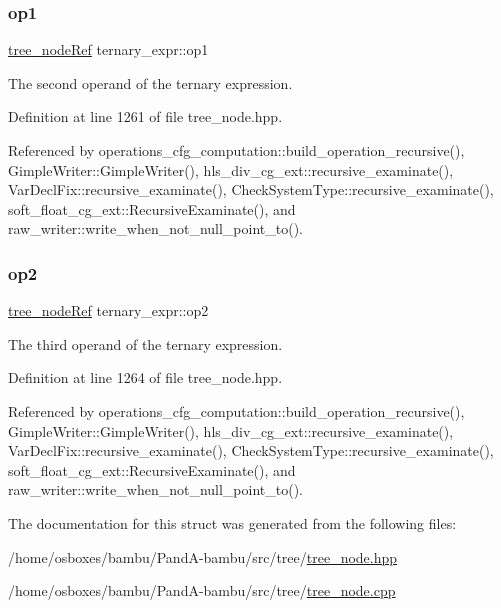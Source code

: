 \mbox{\label{structternary__expr_ad67e5b5fdfe02673e426a8f9cc743ed3}} 
\subsubsection{\texorpdfstring{op1}{op1}}
{\footnotesize\ttfamily \hyperlink{tree__node_8hpp_a6ee377554d1c4871ad66a337eaa67fd5}{tree\+\_\+node\+Ref} ternary\+\_\+expr\+::op1}



The second operand of the ternary expression. 



Definition at line 1261 of file tree\+\_\+node.\+hpp.



Referenced by operations\+\_\+cfg\+\_\+computation\+::build\+\_\+operation\+\_\+recursive(), Gimple\+Writer\+::\+Gimple\+Writer(), hls\+\_\+div\+\_\+cg\+\_\+ext\+::recursive\+\_\+examinate(), Var\+Decl\+Fix\+::recursive\+\_\+examinate(), Check\+System\+Type\+::recursive\+\_\+examinate(), soft\+\_\+float\+\_\+cg\+\_\+ext\+::\+Recursive\+Examinate(), and raw\+\_\+writer\+::write\+\_\+when\+\_\+not\+\_\+null\+\_\+point\+\_\+to().

\mbox{\label{structternary__expr_a55f515fdd2b6a3c150dfcfb4506a43ca}} 
\subsubsection{\texorpdfstring{op2}{op2}}
{\footnotesize\ttfamily \hyperlink{tree__node_8hpp_a6ee377554d1c4871ad66a337eaa67fd5}{tree\+\_\+node\+Ref} ternary\+\_\+expr\+::op2}



The third operand of the ternary expression. 



Definition at line 1264 of file tree\+\_\+node.\+hpp.



Referenced by operations\+\_\+cfg\+\_\+computation\+::build\+\_\+operation\+\_\+recursive(), Gimple\+Writer\+::\+Gimple\+Writer(), hls\+\_\+div\+\_\+cg\+\_\+ext\+::recursive\+\_\+examinate(), Var\+Decl\+Fix\+::recursive\+\_\+examinate(), Check\+System\+Type\+::recursive\+\_\+examinate(), soft\+\_\+float\+\_\+cg\+\_\+ext\+::\+Recursive\+Examinate(), and raw\+\_\+writer\+::write\+\_\+when\+\_\+not\+\_\+null\+\_\+point\+\_\+to().



The documentation for this struct was generated from the following files\+:\begin{DoxyCompactItemize}
\item 
/home/osboxes/bambu/\+Pand\+A-\/bambu/src/tree/\hyperlink{tree__node_8hpp}{tree\+\_\+node.\+hpp}\item 
/home/osboxes/bambu/\+Pand\+A-\/bambu/src/tree/\hyperlink{tree__node_8cpp}{tree\+\_\+node.\+cpp}\end{DoxyCompactItemize}
